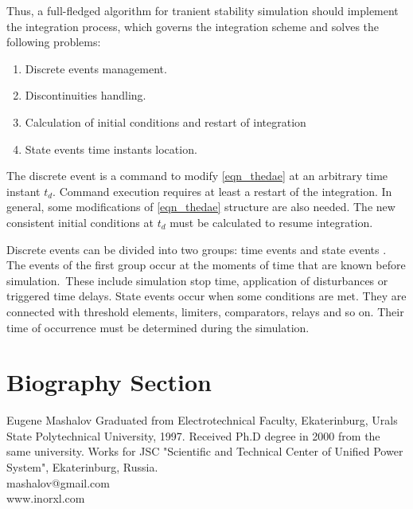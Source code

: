 \documentclass[lettersize,journal]{IEEEtran}
\begin{document}
Thus, a full-fledged algorithm for tranient stability simulation should implement the integration process, which governs the integration scheme and solves the following problems:
\begin{enumerate}
	\item Discrete events management.
	\item Discontinuities handling.
	\item Calculation of initial conditions and restart of integration
	\item State events time instants location.
\end{enumerate}

The discrete event is a command to modify \eqref{eqn_thedae} at an arbitrary time instant \(t_d\). Command execution requires at least a restart of the integration. In general, some modifications of \eqref{eqn_thedae} structure are also needed. The new consistent initial conditions at \(t_d\) must be calculated to resume integration.

Discrete events can be divided into two groups: time events and state events \cite{cellier06}.  The events of the first group occur at the moments of time that are known before simulation. These include simulation stop time, application of disturbances or triggered time delays. State events occur when some conditions are met. They are connected with threshold elements, limiters, comparators, relays and so on.  Their time of occurrence must be determined during the simulation. 








\newpage
\section{Biography Section}
\vspace{-33pt}
\begin{IEEEbiography}{Eugene Mashalov}
Graduated from Electrotechnical Faculty, Ekaterinburg, Urals State Polytechnical University, 1997. 
Received Ph.D degree in 2000 from the same university. 
Works for JSC "Scientific and Technical Center of Unified Power System", Ekaterinburg, Russia.\\
mashalov@gmail.com \\
www.inorxl.com
\end{IEEEbiography}
\vfill
\end{document}
